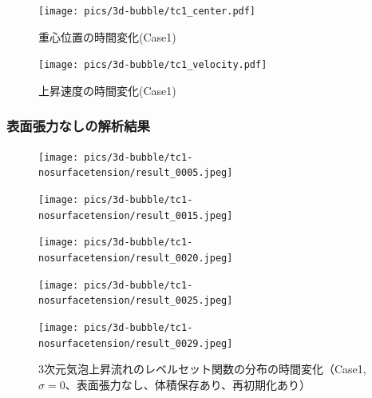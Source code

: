 \begin{figure}[H]
	\centering
	\begin{minipage}[b]{0.49\columnwidth}
	    \centering
	    \texttt{[image: pics/3d-bubble/tc1\_center.pdf]}
		\caption{重心位置の時間変化(Case1)}
		\label{fig:3d-bubble-center-tc1}
	\end{minipage}
	\begin{minipage}[b]{0.49\columnwidth}
	    \centering
	    \texttt{[image: pics/3d-bubble/tc1\_velocity.pdf]}
		\caption{上昇速度の時間変化(Case1)}
		\label{fig:3d-bubble-velocity-tc1}
	\end{minipage}
\end{figure}


\subsubsection{表面張力なしの解析結果}
\begin{figure}[H]
	\centering
	\begin{minipage}[b]{0.16\columnwidth}
	    \centering
	    \texttt{[image: pics/3d-bubble/tc1-nosurfacetension/result\_0005.jpeg]}
	\end{minipage}
	\begin{minipage}[b]{0.16\columnwidth}
	    \centering
	    \texttt{[image: pics/3d-bubble/tc1-nosurfacetension/result\_0015.jpeg]}
	\end{minipage}
	\begin{minipage}[b]{0.16\columnwidth}
	    \centering
	    \texttt{[image: pics/3d-bubble/tc1-nosurfacetension/result\_0020.jpeg]}
	\end{minipage}
	\begin{minipage}[b]{0.16\columnwidth}
	    \centering
	    \texttt{[image: pics/3d-bubble/tc1-nosurfacetension/result\_0025.jpeg]}
	\end{minipage}
	\begin{minipage}[b]{0.16\columnwidth}
	    \centering
	    \texttt{[image: pics/3d-bubble/tc1-nosurfacetension/result\_0029.jpeg]}
	\end{minipage}

	\caption{3次元気泡上昇流れのレベルセット関数の分布の時間変化（Case1, $\sigma=0$、表面張力なし、体積保存あり、再初期化あり）}
	\label{fig:3d-bubble_result_tc1}
\end{figure}

